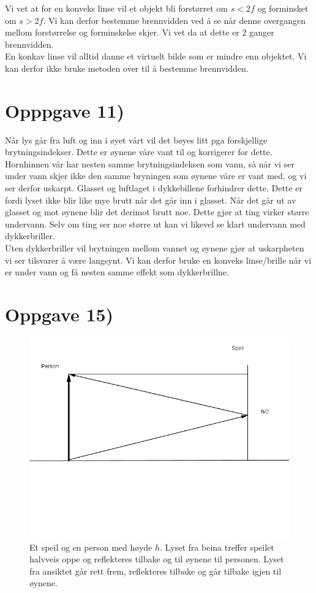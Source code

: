 \documentclass[a4paper,norsk, 10pt]{article}
\begin{document}
Vi vet at for en konveks linse vil et objekt bli forstørret om $s < 2f$ og forminsket om $s>2f$. Vi kan derfor bestemme brennvidden ved å se når denne overgangen mellom forstørrelse og forminskelse skjer. Vi vet da at dette er 2 ganger brennvidden.\\

En konkav linse vil alltid danne et virtuelt bilde som er mindre enn objektet. Vi kan derfor ikke bruke metoden over til å bestemme brennvidden.

\section*{Opppgave 11)}

Når lys går fra luft og inn i øyet vårt vil det bøyes litt pga forskjellige brytningsindekser. Dette er øynene våre vant til og korrigerer for dette. Hornhinnen vår har nesten samme brytningsindeksen som vann, så når vi ser under vann skjer ikke den samme bryningen som øynene våre er vant med, og vi ser derfor uskarpt. Glasset og luftlaget i dykkebillene forhindrer dette. Dette er fordi lyset ikke blir like mye brutt når det går inn i glasset. Når det går ut av glasset og mot øynene blir det derimot brutt noe. Dette gjør at ting virker større undervann. Selv om ting ser noe større ut kan vi likevel se klart undervann med dykkerbriller.\\

Uten dykkerbriller vil brytningen mellom vannet og øynene gjør at uskarpheten vi ser tilsvarer å være langsynt. Vi kan derfor bruke en konveks linse/brille når vi er under vann og få nesten samme effekt som dykkerbrillne.

\section*{Oppgave 15)}

\begin{figure}[H]
\centering
\includegraphics[scale=0.7]{speil.png}
\caption{Et speil og en person med høyde $h$. Lyset fra beina treffer speilet halvveis oppe og reflekteres tilbake og til øynene til personen. Lyset fra ansiktet går rett frem, reflekteres tilbake og går tilbake igjen til øynene.}
\end{figure}
\end{document}
